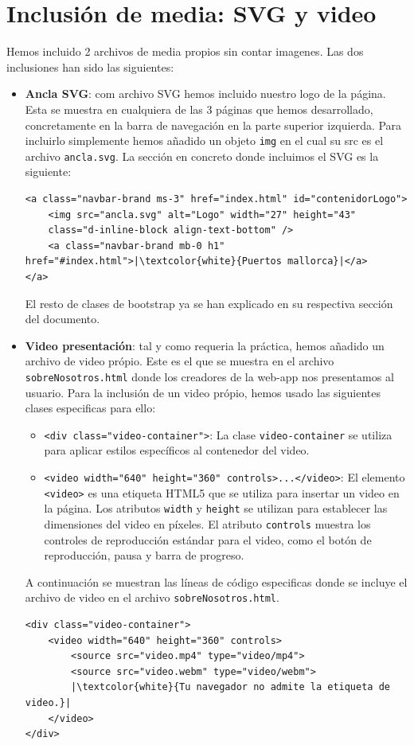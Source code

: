 \documentclass{article}
\begin{document}
\section{Inclusión de media: SVG y video}
Hemos incluido 2 archivos de media propios sin contar imagenes. Las dos inclusiones han sido las siguientes:
\begin{itemize}
    \item \textbf{Ancla SVG}: com archivo SVG hemos incluido nuestro logo de la página. Esta se muestra en cualquiera de las 3 páginas que hemos desarrollado, concretamente en la barra de navegación en la parte superior izquierda. Para incluirlo simplemente hemos añadido un objeto \texttt{img} en el cual su src es el archivo \texttt{ancla.svg}. La sección en concreto donde incluimos el SVG es la siguiente:
    \begin{verbatim}
<a class="navbar-brand ms-3" href="index.html" id="contenidorLogo">
    <img src="ancla.svg" alt="Logo" width="27" height="43" 
    class="d-inline-block align-text-bottom" />
    <a class="navbar-brand mb-0 h1" href="#index.html">|\textcolor{white}{Puertos mallorca}|</a>
</a>
    \end{verbatim}
El resto de clases de bootstrap ya se han explicado en su respectiva sección del documento.
    \item \textbf{Video presentación}: tal y como requeria la práctica, hemos añadido un archivo de video própio. Este es el que se muestra en el archivo \texttt{sobreNosotros.html} donde los creadores de la web-app nos presentamos al usuario. Para la inclusión de un video própio, hemos usado las siguientes clases especificas para ello:
    \begin{itemize}
        \item \texttt{<div class="video-container">}: La clase \texttt{video-container} se utiliza para aplicar estilos específicos al contenedor del video.
            
        \item \texttt{<video width="640" height="360" controls>...</video>}: El elemento \texttt{<video>} es una etiqueta HTML5 que se utiliza para insertar un video en la página. Los atributos \texttt{width} y \texttt{height} se utilizan para establecer las dimensiones del video en píxeles. El atributo \texttt{controls} muestra los controles de reproducción estándar para el video, como el botón de reproducción, pausa y barra de progreso.
    \end{itemize}
    A continuación se muestran las líneas de código especificas donde se incluye el archivo de video en el archivo \texttt{sobreNosotros.html}.
    \begin{verbatim}
<div class="video-container">
    <video width="640" height="360" controls>
        <source src="video.mp4" type="video/mp4">
        <source src="video.webm" type="video/webm">
        |\textcolor{white}{Tu navegador no admite la etiqueta de video.}|
    </video>
</div>
    \end{verbatim}
\end{itemize}
\end{document}
